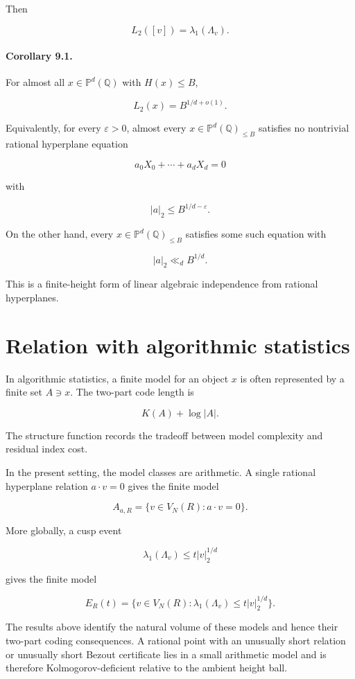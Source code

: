 \documentclass[11pt]{article}
\begin{document}
Then

\[
L_2([v])=\lambda_1(\Lambda_v).
\]

\paragraph{Corollary 9.1.}

For almost all $x\in\mathbb P^d(\mathbb Q)$ with $H(x)\le B$,

\[
L_2(x)=B^{1/d+o(1)}.
\]

Equivalently, for every $\varepsilon>0$, almost every $x\in\mathbb P^d(\mathbb Q)_{\le B}$ satisfies no nontrivial rational hyperplane equation

\[
a_0X_0+\cdots+a_dX_d=0
\]

with

\[
|a|_2\le B^{1/d-\varepsilon}.
\]

On the other hand, every $x\in\mathbb P^d(\mathbb Q)_{\le B}$ satisfies some such equation with

\[
|a|_2\ll_d B^{1/d}.
\]

This is a finite-height form of linear algebraic independence from rational hyperplanes.

\section{Relation with algorithmic statistics}

In algorithmic statistics, a finite model for an object $x$ is often represented by a finite set $A\ni x$. The two-part code length is

\[
K(A)+\log |A|.
\]

The structure function records the tradeoff between model complexity and residual index cost.

In the present setting, the model classes are arithmetic. A single rational hyperplane relation $a\cdot v=0$ gives the finite model

\[
A_{a,R}=\{v\in V_N(R):a\cdot v=0\}.
\]

More globally, a cusp event

\[
\lambda_1(\Lambda_v)\le t|v|_2^{1/d}
\]

gives the finite model

\[
E_R(t)=\{v\in V_N(R):\lambda_1(\Lambda_v)\le t|v|_2^{1/d}\}.
\]

The results above identify the natural volume of these models and hence their two-part coding consequences. A rational point with an unusually short relation or unusually short Bezout certificate lies in a small arithmetic model and is therefore Kolmogorov-deficient relative to the ambient height ball.
\end{document}
